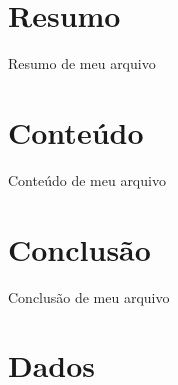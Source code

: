 \documentclass[brazilian,12pt,oneside,a4paper]{article}%
\begin{document}
%
\normalsize%
\setFaixa%
\geraTitulo%
\section{Resumo}%
Resumo de meu arquivo%
\section{Conteúdo}%
Conteúdo de meu arquivo%
\section{Conclusão}%
Conclusão de meu arquivo%
\section{Dados}%
\end{document}
